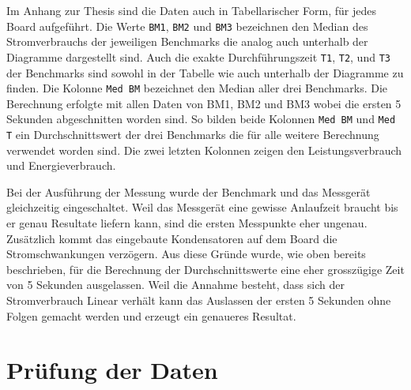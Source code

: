 Im Anhang zur Thesis sind die Daten auch in Tabellarischer Form, für jedes Board aufgeführt. Die Werte \texttt{BM1}, \texttt{BM2} und \texttt{BM3} bezeichnen den Median des Stromverbrauchs der jeweiligen Benchmarks die analog auch unterhalb der Diagramme dargestellt sind. Auch die exakte Durchführungszeit \texttt{T1}, \texttt{T2}, und \texttt{T3} der Benchmarks sind sowohl in der Tabelle wie auch unterhalb der Diagramme zu finden. Die Kolonne \texttt{Med BM} bezeichnet den Median aller drei Benchmarks. Die Berechnung erfolgte mit allen Daten von BM1, BM2 und BM3 wobei die ersten 5 Sekunden abgeschnitten worden sind. So bilden beide Kolonnen \texttt{Med BM} und \texttt{Med T} ein Durchschnittswert der drei Benchmarks die für alle weitere Berechnung verwendet worden sind. Die zwei letzten Kolonnen zeigen den Leistungsverbrauch und Energieverbrauch.
\par
Bei der Ausführung der Messung wurde der Benchmark und das Messgerät gleichzeitig eingeschaltet. Weil das Messgerät eine gewisse Anlaufzeit braucht bis er genau Resultate liefern kann, sind die ersten Messpunkte eher ungenau. Zusätzlich kommt das eingebaute Kondensatoren auf dem Board die Stromschwankungen verzögern. Aus diese Gründe wurde, wie oben bereits beschrieben, für die Berechnung der Durchschnittswerte eine eher grosszügige Zeit von 5 Sekunden ausgelassen. Weil die Annahme besteht, dass sich der Stromverbrauch Linear verhält kann das Auslassen der ersten 5 Sekunden ohne Folgen gemacht werden und erzeugt ein genaueres Resultat.


\section{Prüfung der Daten}


